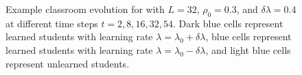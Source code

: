 \documentclass[twocolumn,secnumarabic,amssymb, nobibnotes, aps, prd]{revtex4-2}
\begin{document}

        
        

        
        
    \begin{figure}[htbp!]
        \centering
        \caption{Example classroom evolution for with $L=32$, $\rho_0=0.3$, and $\delta\lambda=0.4$ at different time steps $t=2,8,16,32,54$.
        Dark blue cells represent learned students with learning rate $\lambda=\lambda_0+\delta\lambda$, blue cells represent learned students with learning rate $\lambda=\lambda_0-\delta\lambda$, and light blue cells represent unlearned students.}
        \label{fig:two stage learning}
    \end{figure}
\end{document}
